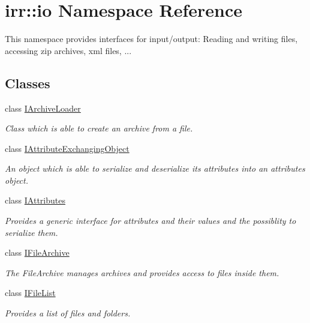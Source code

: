 \hypertarget{namespaceirr_1_1io}{}\section{irr\+:\+:io Namespace Reference}
\label{namespaceirr_1_1io}


This namespace provides interfaces for input/output\+: Reading and writing files, accessing zip archives, xml files, ...  


\subsection*{Classes}
\begin{DoxyCompactItemize}
\item 
class \hyperlink{classirr_1_1io_1_1IArchiveLoader}{I\+Archive\+Loader}
\begin{DoxyCompactList}\small\item\em Class which is able to create an archive from a file. \end{DoxyCompactList}\item 
class \hyperlink{classirr_1_1io_1_1IAttributeExchangingObject}{I\+Attribute\+Exchanging\+Object}
\begin{DoxyCompactList}\small\item\em An object which is able to serialize and deserialize its attributes into an attributes object. \end{DoxyCompactList}\item 
class \hyperlink{classirr_1_1io_1_1IAttributes}{I\+Attributes}
\begin{DoxyCompactList}\small\item\em Provides a generic interface for attributes and their values and the possiblity to serialize them. \end{DoxyCompactList}\item 
class \hyperlink{classirr_1_1io_1_1IFileArchive}{I\+File\+Archive}
\begin{DoxyCompactList}\small\item\em The File\+Archive manages archives and provides access to files inside them. \end{DoxyCompactList}\item 
class \hyperlink{classirr_1_1io_1_1IFileList}{I\+File\+List}
\begin{DoxyCompactList}\small\item\em Provides a list of files and folders. \end{DoxyCompactList}\item 

\end{DoxyCompactItemize}
